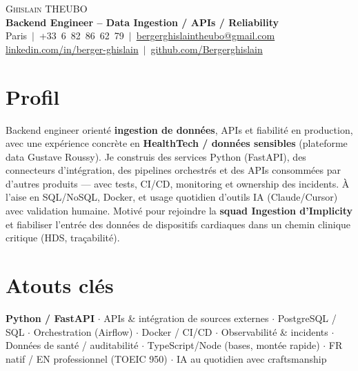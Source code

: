 \documentclass[a4paper,10.5pt]{article}
\begin{document}
\begin{center}
{\Huge \scshape Ghislain THEUBO}\\[3pt]
\textbf{Backend Engineer -- Data Ingestion / APIs / Reliability}\\[3pt]
\small Paris $\,|\,$ +33~6~82~86~62~79 $\,|\,$ \href{mailto:bergerghislaintheubo@gmail.com}{bergerghislaintheubo@gmail.com}\\[1pt]
\href{https://www.linkedin.com/in/berger-ghislain}{linkedin.com/in/berger-ghislain} $\,|\,$ \href{https://github.com/Bergerghislain}{github.com/Bergerghislain}
\end{center}

\section{Profil}
\small{
Backend engineer orient\'e \textbf{ingestion de donn\'ees}, APIs et fiabilit\'e en production, avec une exp\'erience concr\`ete en
\textbf{HealthTech / donn\'ees sensibles} (plateforme data Gustave Roussy). Je construis des services Python (FastAPI),
des connecteurs d'int\'egration, des pipelines orchestr\'es et des APIs consomm\'ees par d'autres produits --- avec tests,
CI/CD, monitoring et ownership des incidents. \`A l'aise en SQL/NoSQL, Docker, et usage quotidien d'outils IA (Claude/Cursor)
avec validation humaine. Motiv\'e pour rejoindre la \textbf{squad Ingestion d'Implicity} et fiabiliser l'entr\'ee des donn\'ees
de dispositifs cardiaques dans un chemin clinique critique (HDS, tra\c{c}abilit\'e).
}

\section{Atouts cl\'es}
\small{
\textbf{Python / FastAPI} $\cdot$ APIs \& int\'egration de sources externes $\cdot$ PostgreSQL / SQL $\cdot$
Orchestration (Airflow) $\cdot$ Docker / CI/CD $\cdot$ Observabilit\'e \& incidents $\cdot$
Donn\'ees de sant\'e / auditabilit\'e $\cdot$ TypeScript/Node (bases, mont\'ee rapide) $\cdot$
FR natif / EN professionnel (TOEIC 950) $\cdot$ IA au quotidien avec craftsmanship
}
\end{document}
